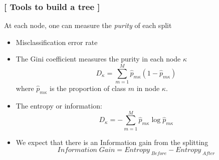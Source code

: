 \documentclass[xcolor=x11names,compress]{beamer}
\renewcommand{\(}{\begin{columns}}
\renewcommand{\)}{\end{columns}}
\newcommand{\<}[1]{\begin{column}{#1}}
\renewcommand{\>}{\end{column}}
\begin{document}
\begin{frame}
\frametitle{\textcolor{brique}{[ Tools to build a tree ]}}
At each node, one can measure the \textit{purity} of each split
\pause
\begin{itemize}[<+->]
    \item  Misclassification error rate
    \item  The Gini coefficient measures the purity in each node $\kappa$
$$
  D_{\kappa} = \sum_{m=1}^M  \widehat{p}_{m \kappa} (1-\widehat{p}_{m
  \kappa})
$$
  where $\widehat{p}_{m \kappa}$ is the proportion of class $m$ in
  node $\kappa$.
    \item  The entropy or information:
 $$
  D_{\kappa} =   - \sum_{m=1}^M  \widehat{p}_{m \kappa}  \log
  \widehat{p}_{m \kappa}
  $$
  \item We expect that there is an Information gain from the splitting
  $$Information\;Gain = Entropy_{\; Before} - Entropy_{\; After}$$

\end{itemize}
\end{frame}
\end{document}
